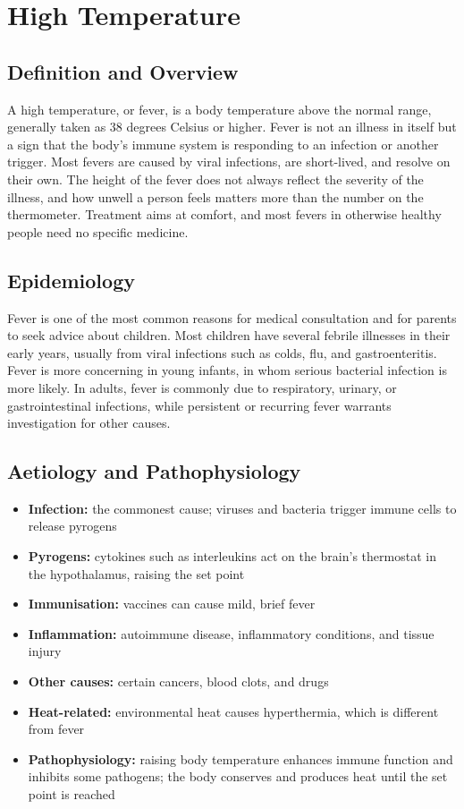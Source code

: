 \chapter{High Temperature}

\section*{Definition and Overview}
A high temperature, or fever, is a body temperature above the normal range, generally taken as 38 degrees Celsius or higher. Fever is not an illness in itself but a sign that the body's immune system is responding to an infection or another trigger. Most fevers are caused by viral infections, are short-lived, and resolve on their own. The height of the fever does not always reflect the severity of the illness, and how unwell a person feels matters more than the number on the thermometer. Treatment aims at comfort, and most fevers in otherwise healthy people need no specific medicine.

\section*{Epidemiology}
Fever is one of the most common reasons for medical consultation and for parents to seek advice about children. Most children have several febrile illnesses in their early years, usually from viral infections such as colds, flu, and gastroenteritis. Fever is more concerning in young infants, in whom serious bacterial infection is more likely. In adults, fever is commonly due to respiratory, urinary, or gastrointestinal infections, while persistent or recurring fever warrants investigation for other causes.

\section*{Aetiology and Pathophysiology}
\begin{itemize}
    \item \textbf{Infection:} the commonest cause; viruses and bacteria trigger immune cells to release pyrogens
    \item \textbf{Pyrogens:} cytokines such as interleukins act on the brain's thermostat in the hypothalamus, raising the set point
    \item \textbf{Immunisation:} vaccines can cause mild, brief fever
    \item \textbf{Inflammation:} autoimmune disease, inflammatory conditions, and tissue injury
    \item \textbf{Other causes:} certain cancers, blood clots, and drugs
    \item \textbf{Heat-related:} environmental heat causes hyperthermia, which is different from fever
    \item \textbf{Pathophysiology:} raising body temperature enhances immune function and inhibits some pathogens; the body conserves and produces heat until the set point is reached
\end{itemize}

